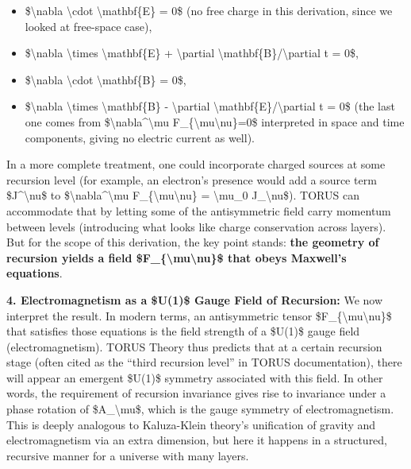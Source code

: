 \documentclass[
]{article}
\begin{document}
{\begin{itemize}
\item
  \$\textbackslash nabla \textbackslash cdot \textbackslash mathbf\{E\}
  = 0\$ (no free charge in this derivation, since we looked at
  free-space case),
\item
  \$\textbackslash nabla \textbackslash times \textbackslash mathbf\{E\}
  + \textbackslash partial
  \textbackslash mathbf\{B\}/\textbackslash partial t = 0\$,
\item
  \$\textbackslash nabla \textbackslash cdot \textbackslash mathbf\{B\}
  = 0\$,
\item
  \$\textbackslash nabla \textbackslash times \textbackslash mathbf\{B\}
  - \textbackslash partial
  \textbackslash mathbf\{E\}/\textbackslash partial t = 0\$ (the last
  one comes from \$\textbackslash nabla\^{}\textbackslash mu
  F\_\{\textbackslash mu\textbackslash nu\}=0\$ interpreted in space and
  time components, giving no electric current as well).
\end{itemize}

In a more complete treatment, one could incorporate charged sources at
some recursion level (for example, an electron's presence would add a
source term \$J\^{}\textbackslash nu\$ to
\$\textbackslash nabla\^{}\textbackslash mu
F\_\{\textbackslash mu\textbackslash nu\} = \textbackslash mu\_0
J\_\textbackslash nu\$). TORUS can accommodate that by letting some of
the antisymmetric field carry momentum between levels (introducing what
looks like charge conservation across layers). But for the scope of this
derivation, the key point stands: \textbf{the geometry of recursion
yields a field \$F\_\{\textbackslash mu\textbackslash nu\}\$ that obeys
Maxwell's equations}\hspace{0pt}.

\textbf{4. Electromagnetism as a \$U(1)\$ Gauge Field of Recursion:} We
now interpret the result. In modern terms, an antisymmetric tensor
\$F\_\{\textbackslash mu\textbackslash nu\}\$ that satisfies those
equations is the field strength of a \$U(1)\$ gauge field
(electromagnetism). TORUS Theory thus predicts that at a certain
recursion stage (often cited as the ``third recursion level'' in TORUS
documentation), there will appear an emergent \$U(1)\$ symmetry
associated with this field\hspace{0pt}. In other words, the requirement
of recursion invariance gives rise to invariance under a phase rotation
of \$A\_\textbackslash mu\$, which is the gauge symmetry of
electromagnetism. This is deeply analogous to Kaluza-Klein theory's
unification of gravity and electromagnetism via an extra dimension, but
here it happens in a structured, recursive manner for a universe with
many layers.

}
\end{document}
